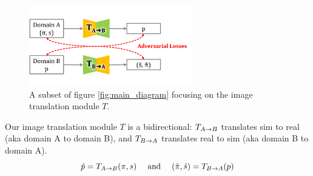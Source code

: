 \documentclass{article}
\begin{document}
	\begin{figure}[H]
		\begin{center}
			\includegraphics[width=200pt]{../images/module_translator.pdf}
		\end{center}
		\caption{
			A subset of figure \ref{fig:main_diagram} focusing on the image translation module $T$.
		}
		\label{fig:module_translator}
	\end{figure}









	
	Our image translation module $T$ is a bidirectional: $T_{A\rightarrow B}$ translates sim to real (aka domain A to domain B), and $T_{B\rightarrow A}$ translates real to sim (aka domain B to domain A).
	\begin{equation}
		\hat{p}=T_{A\rightarrow B}(\pi,s)  \ \ \ \text{ and }\ \ \   (\hat{\pi},\hat{s})=T_{B\rightarrow A}(p)
	\end{equation}
		
\end{document}

